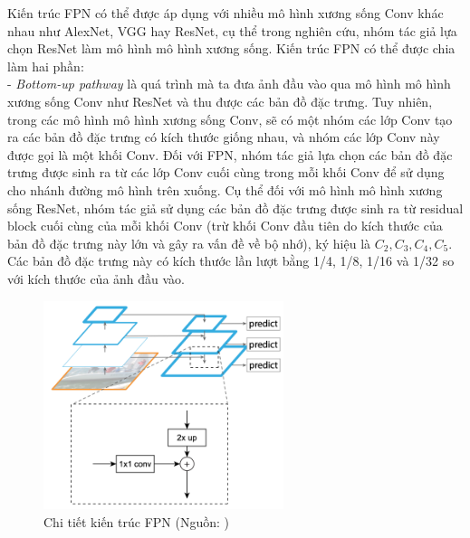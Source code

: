 {    \noindent
    Kiến trúc FPN có thể được áp dụng với nhiều mô hình xương sống Conv khác nhau như AlexNet, VGG hay ResNet, cụ thể trong nghiên cứu, nhóm tác giả lựa chọn ResNet làm mô hình mô hình xương sống.
    Kiến trúc FPN có thể được chia làm hai phần: \\
    - \textit{Bottom-up pathway} là quá trình mà ta đưa ảnh đầu vào qua mô hình mô hình xương sống Conv như ResNet và thu được các bản đồ đặc trưng.
    Tuy nhiên, trong các mô hình mô hình xương sống Conv, sẽ có một nhóm các lớp Conv tạo ra các bản đồ đặc trưng có kích thước giống nhau, và nhóm các lớp Conv này được gọi là một khối Conv.
    Đối với FPN, nhóm tác giả lựa chọn các bản đồ đặc trưng được sinh ra từ các lớp Conv cuối cùng trong mỗi khối Conv để sử dụng cho nhánh đường mô hình trên xuống.
    Cụ thể đối với mô hình mô hình xương sống ResNet, nhóm tác giả sử dụng các bản đồ đặc trưng được sinh ra từ residual block cuối cùng của mỗi khối Conv (trừ khối Conv đầu tiên do kích thước của bản đồ đặc trưng này lớn và gây ra vấn đề về bộ nhớ), ký hiệu là \textit{{${C}_{2}, {C}_{3}, {C}_{4}, {C}_{5}$}}.
    Các bản đồ đặc trưng này có kích thước lần lượt bằng 1/4, 1/8, 1/16 và 1/32 so với kích thước của ảnh đầu vào.

    \begin{figure}[H]
        \centering
        \includegraphics[width=7cm] {images/fpn_detail}
        \caption{Chi tiết kiến trúc FPN (Nguồn: \cite{lin2017feature})}
        \label{fig:fpn_detail}
    \end{figure}

}
